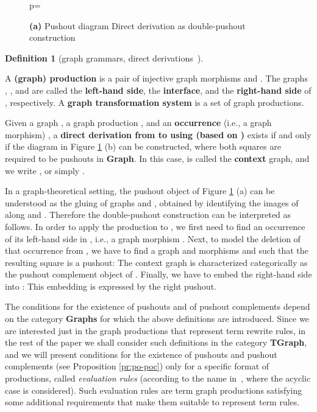 \documentclass{eptcs}
\theoremstyle{plain}
\theoremstyle{definition}
\newtheorem{definition}[theorem]{Definition}
\begin{document}
\begin{figure}
\begin{center}

\hspace{2cm}
p=
\end{center}
\caption{{\bf (a)} Pushout diagram 
Direct derivation as double-pushout construction}
\label{fi:pushout}
\end{figure}


\begin{definition}
[graph grammars, direct derivations~\cite{Ehr:TIAA}]
\label{de:graph-grammar}

A {\bf (graph) production\/}  is a pair of injective 
graph morphisms  and .  The
graphs , , and  are called the {\bf left-hand side},
the {\bf interface}, and the {\bf right-hand side} of ,
respectively. 
A {\bf graph transformation system}  is a set of graph productions.


Given a graph , a graph production , and an 
{\bf occurrence\/} (i.e., a graph morphism) , a
{\bf direct derivation  from  to  using  (based on 
)}
exists if and only if the diagram in Figure \ref{fi:pushout} (b)
can be constructed, where both squares are required to be 
pushouts in
{\bf Graph}. In this case,  is called the {\bf context\/} graph,
and we write , or simply .
\end{definition}


In a graph-theoretical setting, the pushout object  of Figure
\ref{fi:pushout} (a) can be understood as the gluing of graphs  and 
, obtained by identifying the images of  along  and . 
Therefore the double-pushout construction can be interpreted as 
follows. In
order to apply the production  to , we first need to find an
occurrence of its left-hand side  in , i.e., a graph morphism 
. Next, to model the deletion of that occurrence from
, we have to find a graph  and morphisms  and  such that
the resulting square is a pushout: The context graph  is 
characterized categorically as the pushout
complement object of . Finally, we have to
embed the right-hand side  into : This embedding 
is expressed by the right pushout. 

The conditions for the existence of 
pushouts and of pushout complements depend on the category {\bf 
Graphs} 
for which the above definitions are introduced. Since we are 
interested 
just in the graph productions that represent term rewrite rules, in 
the 
rest of the paper we shall consider such definitions in the category 
{\bf TGraph}, and we will present conditions for the 
existence
of pushouts and pushout complements (see Proposition \ref{pr:po-poc}) 
only for a specific format of productions, called 
{\em evaluation rules} (according to the name in~\cite{HP:ITRJ}, where 
the
acyclic case is considered). 
Such evaluation rules are term graph productions satisfying 
some additional requirements that make them suitable to represent term 
rules.
\end{document}
